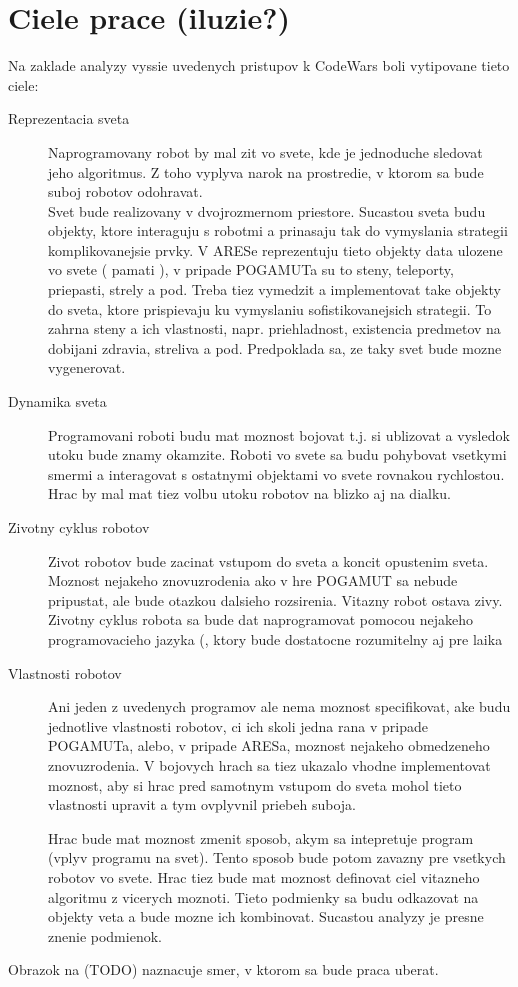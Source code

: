 \documentclass[a4paper,11pt,final]{report}
\begin{document}
\section{Ciele prace (iluzie?)}%
Na zaklade analyzy vyssie uvedenych pristupov k CodeWars boli vytipovane  tieto ciele:
\begin{description}
\item [Reprezentacia sveta]
Naprogramovany robot by mal zit vo svete, kde je jednoduche sledovat jeho algoritmus. Z toho vyplyva narok na prostredie, v ktorom sa bude suboj robotov odohravat. \\
Svet bude realizovany v dvojrozmernom priestore. Sucastou sveta budu objekty, ktore interaguju s robotmi a prinasaju tak do vymyslania strategii komplikovanejsie prvky. V ARESe reprezentuju tieto objekty data ulozene vo svete ( pamati ), v pripade POGAMUTa su to steny, teleporty, priepasti, strely a pod. Treba tiez vymedzit a implementovat take objekty do sveta, ktore prispievaju ku vymyslaniu sofistikovanejsich strategii. To zahrna steny a ich vlastnosti, napr. priehladnost, existencia predmetov na dobijani zdravia, streliva a pod. Predpoklada sa, ze taky svet bude mozne vygenerovat.
\item [Dynamika sveta] 
Programovani roboti budu mat moznost bojovat t.j. si ublizovat a vysledok utoku bude znamy okamzite. Roboti vo svete sa budu pohybovat vsetkymi smermi a interagovat s ostatnymi objektami vo svete rovnakou rychlostou. Hrac by mal mat tiez volbu utoku robotov na blizko aj na dialku.
\item [Zivotny cyklus robotov]
Zivot robotov bude zacinat vstupom do sveta a koncit opustenim sveta. Moznost nejakeho znovuzrodenia ako v hre POGAMUT sa nebude pripustat, ale bude otazkou dalsieho rozsirenia. Vitazny robot ostava zivy. Zivotny cyklus robota sa bude dat naprogramovat pomocou nejakeho programovacieho jazyka (, ktory bude dostatocne rozumitelny aj pre laika%
\item [Vlastnosti robotov] 
Ani jeden z uvedenych programov ale nema moznost specifikovat, ake budu  jednotlive  vlastnosti robotov, ci ich skoli jedna rana v pripade POGAMUTa,  alebo, v  pripade  ARESa, moznost nejakeho obmedzeneho znovuzrodenia. V bojovych  hrach sa tiez ukazalo vhodne implementovat moznost, aby si hrac pred samotnym vstupom do sveta mohol tieto  vlastnosti upravit a tym ovplyvnil priebeh suboja.

Hrac bude mat moznost zmenit sposob, akym sa  intepretuje program (vplyv programu na svet). Tento sposob bude potom  zavazny pre vsetkych robotov vo svete. Hrac tiez bude mat moznost definovat ciel vitazneho algoritmu z vicerych moznoti. Tieto podmienky sa budu odkazovat na objekty veta a bude mozne ich kombinovat. Sucastou analyzy je presne znenie podmienok.
\end{description}
Obrazok na (TODO) naznacuje smer, v ktorom sa bude praca uberat. \\
\end{document}
